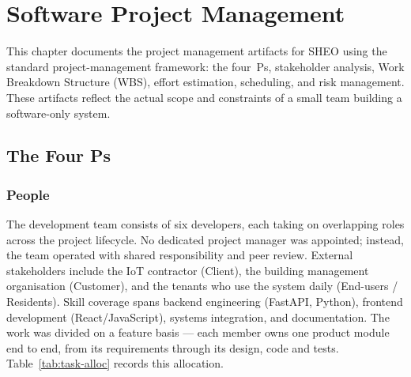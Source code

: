 \chapter{Software Project Management}

This chapter documents the project management artifacts for SHEO using the standard
project-management framework: the four~Ps, stakeholder analysis, Work Breakdown
Structure (WBS), effort estimation, scheduling, and risk management. These artifacts
reflect the actual scope and constraints of a small team building a software-only system.

\section{The Four Ps}

\subsection{People}
The development team consists of six developers, each taking on
overlapping roles across the project lifecycle.  No dedicated project manager
was appointed; instead, the team operated with shared responsibility and peer
review.  External stakeholders include the IoT contractor (Client), the building
management organisation (Customer), and the tenants who use the system daily
(End-users / Residents).  Skill coverage spans backend engineering (FastAPI,
Python), frontend development (React/JavaScript), systems integration, and
documentation.  The work was divided on a feature basis --- each member owns one
product module end to end, from its requirements through its design, code and tests.
Table~\ref{tab:task-alloc} records this allocation.

